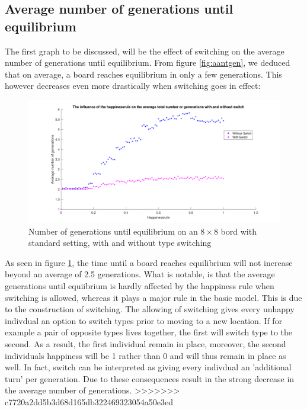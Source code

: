 \subsection{Average number of generations until equilibrium}
The first graph to be discussed, will be the effect of switching on the average number of generations until equilibrium. From figure \ref{fig:aantgen}, we deduced that on average, a board reaches equilibrium in only a few generations. This however decreases even more drastically when switching goes in effect:
\begin{figure}[H]
	\centering
    \includegraphics[width=\textwidth]{happinessrule-totaantgenwithswitchorwithoutswitch.pdf}
    \caption{Number of generations until equilibrium on an $8\times 8$ bord with standard setting, with and without type switching}
    \label{fig:AantGenS}
\end{figure}
As seen in figure \ref{fig:AantGenS}, the time until a board reaches equilibrium will not increase beyond an average of 2.5 generations. 
What is notable, is that the average generations until equiibrium is hardly affected by the happiness rule when switching is allowed, whereas it plays a major rule in the basic model. 
This is due to the construction of switching. The allowing of switching gives every unhappy indivdual an option to switch types prior to moving to a new location. 
If for example a pair of opposite types lives together, the first will switch type to the second. As a result, the first individual remain in place, moreover, the second individuals happiness will be 1 rather than 0 and will thus remain in place as well. 
In fact, switch can be interpreted as giving every indivdual an 'additional turn' per generation. Due to these consequences result in the strong decrease in the average number of generations.
>>>>>>> c7720a2dd5b3d68d165db322469323054a50e3ed
